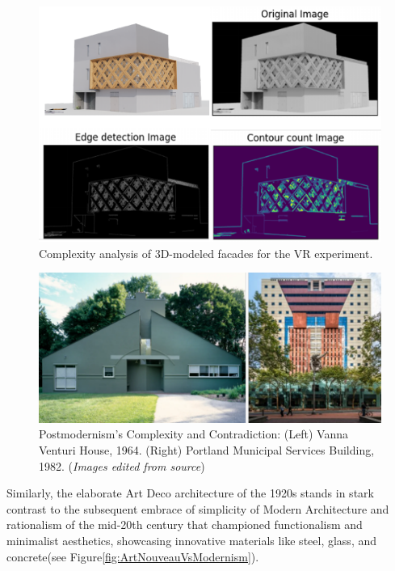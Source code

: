     \begin{figure}[htb]
    \centering
    \includegraphics[width= \linewidth]{Images/ComplexitPlotRenderCICA}
    \caption{Complexity analysis of 3D-modeled facades for the VR experiment.}
    \label{fig:ComplexityPlotRenderCICA}
    \end{figure}

\begin{figure}[htb]
\centering
\includegraphics[width= \linewidth]{Images/PostmodernismVenturi}
\caption{Postmodernism's Complexity and Contradiction: (Left) Vanna Venturi House, 1964. (Right) Portland Municipal Services Building, 1982. (\textit{Images edited from source})}
\label{fig:postmodernfacade}
\end{figure}

Similarly, the elaborate Art Deco architecture of the 1920s stands in stark contrast to the subsequent embrace of simplicity of Modern Architecture and rationalism  of the mid-20th century that championed functionalism and minimalist aesthetics, showcasing innovative materials like steel, glass, and concrete\cite{Stacbond2020}(see Figure\ref{fig:ArtNouveauVsModernism}).



